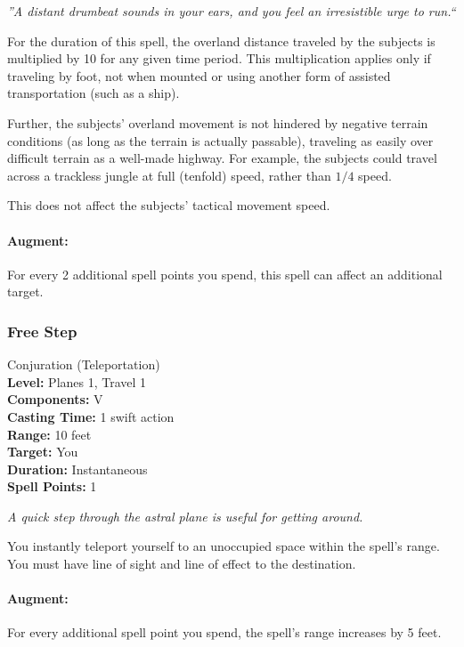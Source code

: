 \emph{''A distant drumbeat sounds in your ears, and you feel an irresistible urge to run.``}

For the duration of this spell, the overland distance traveled by the subjects is multiplied by 10 for any given time period.
This multiplication applies only if traveling by foot, not when mounted or using another form of assisted transportation (such as a ship).

Further, the subjects' overland movement is not hindered by negative terrain conditions (as long as the terrain is actually passable), traveling as easily over difficult terrain as a well-made highway.
For example, the subjects could travel across a trackless jungle at full (tenfold) speed, rather than $1/4$ speed.

This does not affect the subjects' tactical movement speed.

\paragraph{Augment:} For every 2 additional spell points you spend, this spell can affect an additional target.

\subsubsection{Free Step}
\label{Spell:FreeStep}
Conjuration (Teleportation)
\\ \textbf{Level:} Planes 1, Travel 1
\\ \textbf{Components:} V
\\ \textbf{Casting Time:} 1 swift action
\\ \textbf{Range:} 10 feet
\\ \textbf{Target:} You
\\ \textbf{Duration:} Instantaneous
\\ \textbf{Spell Points:} 1

\emph{A quick step through the astral plane is useful for getting around.}

You instantly teleport yourself to an unoccupied space within the spell's range.
You must have line of sight and line of effect to the destination.

\paragraph{Augment:} For every additional spell point you spend, the spell's range increases by 5 feet.

